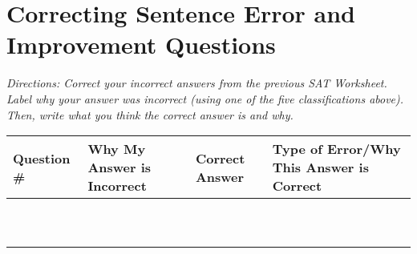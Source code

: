 \section{Correcting Sentence Error and Improvement Questions}

\textit{Directions: Correct your incorrect answers from the previous SAT Worksheet. Label why your answer
was incorrect (using one of the five classifications above). Then, write what you think the correct
answer is and why.}

\begin{tabularx}{\textwidth}{|X|p{2in}|p{2in}|X|}\hline
Question \# & Why My Answer is Incorrect & Correct Answer & Type of Error/Why This Answer is Correct\\\hline
& & &\\[5ex]\hline
& & &\\[5ex]\hline
& & &\\[5ex]\hline
& & &\\[5ex]\hline
& & &\\[5ex]\hline
& & &\\[5ex]\hline
& & &\\[5ex]\hline
& & &\\[5ex]\hline
& & &\\[5ex]\hline
& & &\\[5ex]\hline
\end{tabularx}

